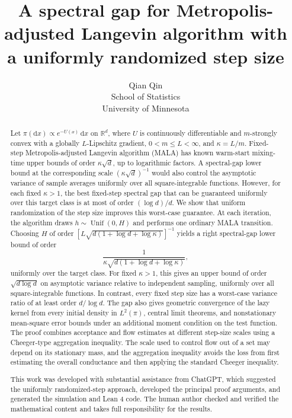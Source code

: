 \documentclass[11pt]{article}
\title{\bf A spectral gap for Metropolis-adjusted Langevin algorithm with a uniformly randomized step size}
\author{Qian Qin \\ School of Statistics \\ University of Minnesota}
\date{}
\newcommand{\R}{\mathbb R}
\newcommand{\1}{\mathbf 1}
\begin{document}
	\maketitle
	
	\begin{abstract}
		
		Let $\pi(\mathrm{d} x)\propto e^{-U(x)}\, \mathrm{d} x$ on $\R^d$, where
		$U$ is continuously differentiable and $m$-strongly convex with a globally
		$L$-Lipschitz gradient, $0<m\leq L<\infty$, and $\kappa=L/m$.
		Fixed-step Metropolis-adjusted Langevin algorithm (MALA) has known
		warm-start mixing-time upper bounds of order $\kappa\sqrt d$, up to logarithmic
		factors. A spectral-gap lower bound at the corresponding scale $(\kappa \sqrt{d})^{-1}$ would also
		control the asymptotic variance of sample averages uniformly over all
		square-integrable functions. However, for each fixed $\kappa>1$, the
		best fixed-step spectral gap that can be guaranteed uniformly over this
		target class is at most of order $(\log d)/d$.
		We show that uniform randomization of the step size improves this
		worst-case guarantee. At each iteration, the algorithm draws
		$h\sim\operatorname{Unif}(0,H)$ and performs one ordinary MALA transition.
		Choosing $H$ of order
		$[L\sqrt{d(1+\log d+\log\kappa)}]^{-1}$ yields a right
		spectral-gap lower bound of order
		\[
		\frac{1}{\kappa\sqrt{d(1+\log d+\log\kappa)}},
		\]
		uniformly over the target class. For fixed $\kappa>1$, this gives an
		upper bound of order $\sqrt{d\log d}$ on asymptotic variance relative to
		independent sampling, uniformly over all square-integrable functions.
		In contrast, every fixed step size has a worst-case variance ratio of
		at least order $d/\log d$. The gap also gives geometric convergence of
		the lazy kernel from every initial density in $L^2(\pi)$, central limit
		theorems, and nonstationary mean-square error bounds under an additional
		moment condition on the test function.
		The proof combines acceptance and flow estimates at different step-size
		scales using a Cheeger-type aggregation inequality. The scale used to
		control flow out of a set may depend on its stationary mass, and the
		aggregation inequality avoids the loss from first estimating the overall
		conductance and then applying the standard Cheeger inequality.
		
		
		This work was developed with substantial assistance from ChatGPT, which suggested the uniformly randomized-step approach, developed the principal proof arguments, and generated the simulation and Lean 4 code. The human author checked and verified the mathematical content and takes full responsibility for the results.
	\end{abstract}
	
\end{document}
